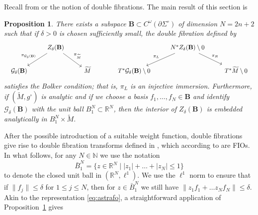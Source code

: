 \documentclass[11pt]{amsart}
\newtheorem{Proposition}[Theorem]{Proposition}
\theoremstyle{definition}
\numberwithin{equation}{section}
\newcommand{\mR}{\mathbb{R}}                    %
\newcommand{\G}{\mathcal G}
\newcommand{\BB}{\mathbf B}
\begin{document}
Recall from \cite[Def.~1.5]{MST} or \cite[\S~8]{zbMATH03698077} the notion of double fibrations. The main result of this section is 
\begin{Proposition}\label{prop: bolker}
There exists a subspace $\BB \subset C^\omega(\partial\Sigma^\circ)$ of dimension $N=2n+2$ such that if $\delta >0$ is chosen sufficiently small, the double fibration defined by
\begin{equation} \label{df_diagrams}
\begin{tabular}{cc}
\begin{tikzcd}
& Z_\delta(\BB) \arrow[dl,swap,"\pi_{\G_\delta(\BB)}"] \arrow[dr,"\pi_{\widetilde M}"] \\
\G_\delta(\BB) && \widetilde M
\end{tikzcd} \qquad & \qquad
\begin{tikzcd}
& N^*Z_\delta(\BB)\setminus 0 \arrow[dl,swap,"\pi_L"] \arrow[dr,"\pi_R"] \\
T^*\G_\delta(\BB) \setminus 0 && T^* \widetilde M \setminus 0
\end{tikzcd}
\end{tabular}
\end{equation}
 satisfies the Bolker condition; that is, $\pi_L$ is an injective immersion. Furthermore, if $(\widetilde{M},g^\circ)$ is analytic and if we choose a basis $f_1,\dots, f_N\in \BB$ and identify $\mathcal G_\delta(\BB)$ with the unit ball $B^N_1\subset\mathbb R^N$, then the interior of $Z_\delta(\BB)$ is embedded analytically in $B_1^N \times \widetilde M$.
\end{Proposition}
After the possible introduction of a suitable weight function, double fibrations give rise to double fibration transforms defined in \cite[Def.~1.5]{MST}, which according to \cite[Thm.~2.2]{MST} are FIOs. %
In what follows, for any $N\in\mathbb{N}$ we use the notation 
\[
\bar B_1^N = \{ z \in \mR^N \mid |z_1| + \ldots + |z_N| \leq 1 \}
\]
to denote the closed unit ball in $(\mathbb R^{N}, \ell^1)$. We use the $\ell^1$ norm to ensure that if $\|f_j\| \leq \delta$ for $1 \leq j \leq N$, then for $z \in \bar B_1^N$ we still have $\| z_1 f_1 + \ldots z_N f_N \| \leq \delta$. Akin to the representation \eqref{eq:astrafo}, a straightforward application of Proposition~\ref{prop: bolker} gives 
\end{document}
